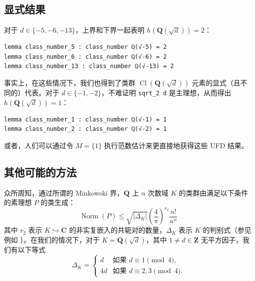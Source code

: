 \documentclass[sigplan,10pt,nonacm,
screen]{acmart} \settopmatter{printfolios=true,printccs=false,printacmref=false}
\newcommand{\QQ}{\mathbf{Q}}
\newcommand{\ZZ}{\mathbf{Z}}
\newcommand{\CC}{\mathbf{C}}
\newcommand{\OK}{\mathcal{O}_K}
\DeclareMathOperator{\Norm}{Norm}
\DeclareMathOperator{\Cl}{Cl}
\begin{document}
\subsection{显式结果}\label{sec:class_group_expl}

对于 $d\in\{-5,-6,-13\}$，上界和下界一起表明 $h(\QQ(\sqrt{d}))=2$：
\begin{lstlisting}
lemma class_number_5 : class_number ℚ(√-5) = 2
lemma class_number_6 : class_number ℚ(√-6) = 2
lemma class_number_13 : class_number ℚ(√-13) = 2
\end{lstlisting}

事实上，在这些情况下，我们也得到了类群 $\Cl(\QQ(\sqrt{d}))$ 元素的显式（且不同的）代表。对于 $d \in \{-1,-2\}$，不难证明 \lstinline{sqrt_2 d} 是主理想，从而得出 $h(\QQ(\sqrt{d}))=1$：
\begin{lstlisting}
lemma class_number_1 : class_number ℚ(√-1) = 1
lemma class_number_2 : class_number ℚ(√-2) = 1
\end{lstlisting}

或者，人们可以通过令 $M= \{1\}$ 执行范数估计来更直接地获得这些 UFD 结果。

%

\subsection{其他可能的方法}\label{sec:OtherApproaches}

众所周知，通过所谓的 Minkowski 界，$\QQ$ 上 $n$ 次数域 $K$ 的类群由满足以下条件的素理想 $P$ 的类生成：
\begin{equation}\label{eqn:Minkowski}
\Norm(P) \leq \sqrt{|\Delta_K|}\left(\dfrac{4}{\pi}\right)^{r_2}\dfrac{n!}{n^n}
\end{equation}
其中 $r_2$ 表示 $K \hookrightarrow \CC$ 的非实复嵌入的共轭对的数量，$\Delta_K$ 表示 $K$ 的判别式（参见例如 \cite[第 I.5 节]{Neukirch}）。在我们的情况下，对于 $K=\QQ(\sqrt{d})$，其中 $1\not=d \in \ZZ$ 无平方因子，我们有以下等式
\begin{equation*}
\Delta_K = \left\lbrace
\begin{array}{ll}
d & \text{如果 } d \equiv 1 \pmod 4, \\
4d & \text{如果 } d \equiv 2,3 \pmod 4.
\end{array}
\right.
\end{equation*}
\end{document}
